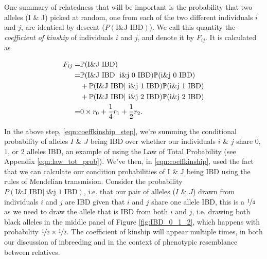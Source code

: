 {{One summary of relatedness that will be important is the probability that two
alleles (I \& J) picked at random, one from each of the two different individuals $i$
and $j$, are identical by descent ($P(\text{I\&J IBD})$). We call this quantity the \emph{coefficient
of kinship} of individuals $i$ and $j$, and denote it by $F_{ij}$. It is
calculated as

\begin{align}
  F_{ij} = & \P(\text{I\&J IBD} )\\
  =& \P(\text{I\&J IBD} |~ \text{i\&j  0 IBD}) \P(\text{i\&j  0 IBD})  \nonumber\\
  & + \P(\text{I\&J IBD} |~ \text{i\&j  1 IBD})
    \P(\text{i\&j  1 IBD})  \nonumber\\
  &+ \P(\text{I\&J IBD} |~ \text{i\&j  2 IBD}) \P(\text{i\&j  2 IBD}) \label{eqn:coeffkinship_step}\\
   =   &   0 \times r_0 + \frac{1}{4} r_1  + \frac{1}{2} r_2.
\label{eqn:coeffkinship}
\end{align}


In the above step, \eqn \eqref{eqn:coeffkinship_step}, we're summing the
conditional probability of alleles $I$ \& $J$ being IBD over whether our individuals $i$ \& $j$ share $0$, $1$,
or $2$ alleles IBD, an example of using the Law of Total Probability (see Appendix
\eqn \eqref{eqn:law_tot_prob}).  We've then, in \eqn \ref{eqn:coeffkinship}, used the fact that we can
calculate our condition probabilities of  I \& J being IBD using the
rules of Mendelian transmision. Consider the probability $
P(\text{I\&J IBD} |~ \text{i\&j  1 IBD})$, i.e. that our
pair of alleles ($I$ \& $J$) drawn from individuals $i$ and $j$ are IBD given that
$i$ and $j$ share one allele IBD, this is a $\nicefrac{1}{4}$ as we need to
draw the allele that is IBD from both $i$ and $j$, i.e. drawing both black
alleles in the middle panel of Figure \ref{fig:IBD_0_1_2}, which
happens with probability $\nicefrac{1}{2} \times \nicefrac{1}{2} $. 
The coefficient of kinship will appear multiple times, in both our discussion of
inbreeding and in the context of phenotypic resemblance between relatives.\\

}}
